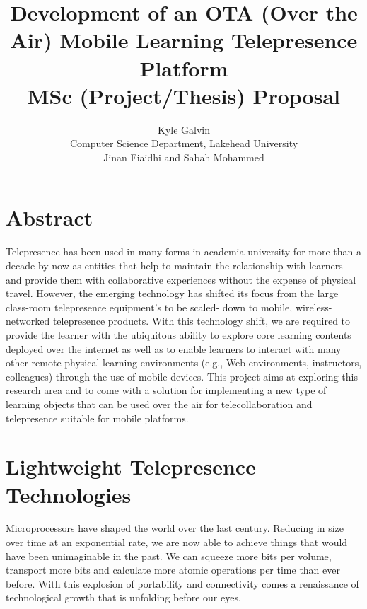 \documentclass[a4paper,12pt]{report}
\begin{document}
\begin{titlepage}
\title{Development of an OTA (Over the Air) Mobile Learning Telepresence Platform\\ MSc (Project/Thesis) Proposal}
\author{Kyle Galvin\\ Computer Science Department, Lakehead University\\
Jinan Fiaidhi and Sabah Mohammed}
\end{titlepage}

\maketitle

\tableofcontents

\chapter*{\centering Abstract}
Telepresence has been used in many forms in academia university for more than a decade by now as entities that help to maintain the relationship with learners and provide them with collaborative experiences without the expense of physical travel. However, the emerging technology has shifted its focus from the large class-room telepresence equipment’s to be scaled- down to mobile, wireless-networked telepresence products. With this technology shift, we are required to provide the learner with the ubiquitous ability to explore core learning contents deployed over the internet as well as to enable learners to interact with many other remote physical learning environments (e.g., Web environments, instructors, colleagues) through the use of mobile devices. This project aims at exploring this research area and to come with a solution for implementing a new type of learning objects that can be used over the air for telecollaboration and telepresence suitable for mobile platforms. 

\chapter{Lightweight Telepresence Technologies}
Microprocessors have shaped the world over the last century. Reducing in size over time at an exponential rate, we are now able to achieve things that would have been unimaginable in the past. We can squeeze more bits per volume, transport more bits and calculate more atomic operations per time than ever before. With this explosion of portability and connectivity comes a renaissance of technological growth that is unfolding before our eyes.
\end{document}
